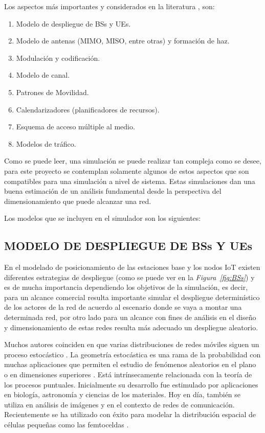 Los aspectos más importantes y considerados en la literatura \parencite{WirelessSim}, son:
\begin{enumerate}
    \item  Modelo de despliegue de BSs y UEs.
    \item  Modelo de antenas (MIMO, MISO, entre otras) y formación de haz.
    \item  Modulación y codificación.
    \item  Modelo de canal.
    \item  Patrones de Movilidad.
    \item  Calendarizadores (planificadores de recursos).
    \item  Esquema de acceso múltiple al medio.
    \item  Modelos de tráfico.
\end{enumerate}

Como se puede leer, una simulación se puede realizar tan compleja como se desee, para este proyecto se contemplan solamente algunos de estos aspectos que son compatibles para una simulación a nivel de sistema. Estas simulaciones dan una buena estimación de un análisis fundamental desde la perspectiva del dimensionamiento que puede alcanzar una red.\newline

Los modelos que se incluyen en el simulador son los siguientes:

\subsection{MODELO DE DESPLIEGUE DE BSs Y UEs}

En el modelado de posicionamiento de las estaciones base y los nodos IoT existen diferentes estrategias de despliegue (como se puede ver en la \textit{Figura~\ref{fig:BSs}}) y es de mucha importancia dependiendo los objetivos de la simulación, es decir, para un alcance comercial resulta importante simular el despliegue determinístico de los actores de la red de acuerdo al escenario donde se vaya a montar una determinada red, por otro lado para un alcance con fines de análisis en el diseño y dimensionamiento de estas redes resulta más adecuado un despliegue aleatorio. \newline

Muchos autores coinciden en que varias distribuciones de redes móviles siguen un proceso estocástico \parencite{Kouzayha2018}\parencite{Zhang2017}. La geometría estocástica es una rama de la probabilidad con muchas aplicaciones que permiten el estudio de fenómenos aleatorios en el plano o en dimensiones superiores \parencite{Haenggi2009}. Está intrínsecamente relacionada con la teoría de los procesos puntuales. Inicialmente su desarrollo fue estimulado por aplicaciones en biología, astronomía y ciencias de los materiales. Hoy en día, también se utiliza en análisis de imágenes y en el contexto de redes de comunicación. Recientemente se ha utilizado con éxito para modelar la distribución espacial de células pequeñas como las femtoceldas \parencite{TurjmanSmallCells}. \newline

